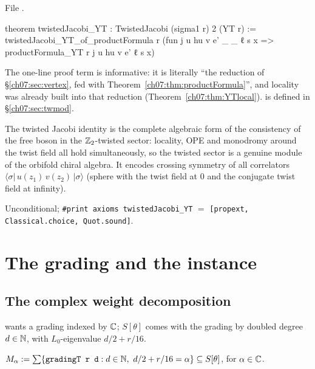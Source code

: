 \noindent File .
\begin{leancode}
theorem twistedJacobi_YT : TwistedJacobi (sigma1 r) 2 (YT r) :=
  twistedJacobi_YT_of_productFormula r
    (fun j u hu v e' _ _ ℓ s x => productFormula_YT r j u hu v e' ℓ s x)
\end{leancode}

\begin{dictionary}
The one-line proof term is informative: it is literally ``the reduction of
\S\ref{ch07:sec:vertex}, fed with Theorem~\ref{ch07:thm:productFormula}'', and locality was
already built into that reduction (Theorem~\ref{ch07:thm:YTlocal}).  is
defined in \S\ref{ch07:sec:twmod}.
\end{dictionary}

\begin{physics}
The twisted Jacobi identity is the complete algebraic form of the consistency of the free boson in the ${\mathbb{Z}}_2$-twisted sector: locality, OPE and monodromy around the twist field all hold simultaneously, so the twisted sector is a genuine module of the orbifold chiral algebra. It encodes crossing symmetry of all correlators $\langle\sigma|\,u(z_1)\,v(z_2)\,|\sigma\rangle$ (sphere with the twist field at $0$ and the conjugate twist field at infinity).
\end{physics}

\begin{status}
Unconditional; \verb|#print axioms twistedJacobi_YT| $=$ \texttt{[propext, Classical.choice,
Quot.sound]}.
\end{status}

\section{The grading and the instance}\label{ch07:sec:instance}

\subsection{The complex weight decomposition}

 wants a grading indexed by ${\mathbb{C}}$; $S[\theta]$ comes with the grading
 by doubled degree $d\in{\mathbb{N}}$, with $L_0$-eigenvalue $d/2+r/16$.

\begin{definition}\label{ch07:def:weightC}
$M_\alpha := \sum\{\lean{gradingT r d} : d\in\N,\ d/2+r/16 = \alpha\}\subseteq S[\theta]$, for
$\alpha\in{\mathbb{C}}$.
\end{definition}


